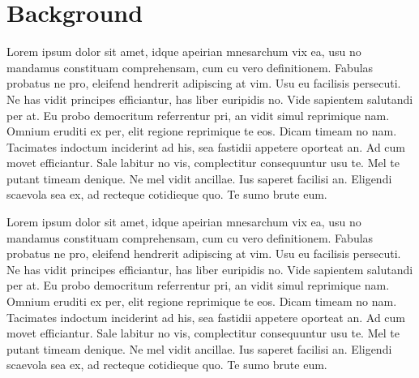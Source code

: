 \appendix
\chapter{Background}
Lorem ipsum dolor sit amet, idque apeirian mnesarchum vix ea, usu no mandamus constituam comprehensam, cum cu vero definitionem. Fabulas probatus ne pro, eleifend hendrerit adipiscing at vim. Usu eu facilisis persecuti. Ne has vidit principes efficiantur, has liber euripidis no. Vide sapientem salutandi per at. Eu probo democritum referrentur pri, an vidit simul reprimique nam. Omnium eruditi ex per, elit regione reprimique te eos. Dicam timeam no nam. Tacimates indoctum inciderint ad his, sea fastidii appetere oporteat an. Ad cum movet efficiantur. Sale labitur no vis, complectitur consequuntur usu te. Mel te putant timeam denique. Ne mel vidit ancillae. Ius saperet facilisi an. Eligendi scaevola sea ex, ad recteque cotidieque quo. Te sumo brute eum.

Lorem ipsum dolor sit amet, idque apeirian mnesarchum vix ea, usu no mandamus constituam comprehensam, cum cu vero definitionem. Fabulas probatus ne pro, eleifend hendrerit adipiscing at vim. Usu eu facilisis persecuti. Ne has vidit principes efficiantur, has liber euripidis no. Vide sapientem salutandi per at. Eu probo democritum referrentur pri, an vidit simul reprimique nam. Omnium eruditi ex per, elit regione reprimique te eos. Dicam timeam no nam. Tacimates indoctum inciderint ad his, sea fastidii appetere oporteat an. Ad cum movet efficiantur. Sale labitur no vis, complectitur consequuntur usu te. Mel te putant timeam denique. Ne mel vidit ancillae. Ius saperet facilisi an. Eligendi scaevola sea ex, ad recteque cotidieque quo. Te sumo brute eum.
